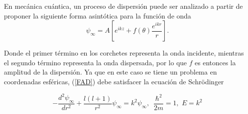 En mecánica cuántica, un proceso de dispersión puede ser analizado a partir de proponer la siguiente forma asintótica para la función de onda
\begin{equation}
	\psi_{\infty} = A \left[e^{i k z} + f(\theta)  \frac{e^{i k r}}{r} \right]. \label{FAD}
\end{equation}

Donde el primer término en los corchetes representa la onda incidente, mientras el segundo término representa la onda dispersada, por lo que $f$ es entonces la amplitud de la dispersión. Ya que en este caso se tiene un problema en coordenadas esféricas, (\ref{FAD}) debe satisfacer la ecuación de Schrödinger 

\begin{equation}
-\frac{d^2\psi_{\infty}}{dr^2} + \frac{l(l+1)}{r^2}\psi_{\infty} = k^2 \psi_{\infty} , \,\,\, \frac{\hbar^2}{2m}=1, \,\, E=k^2
\end{equation}


